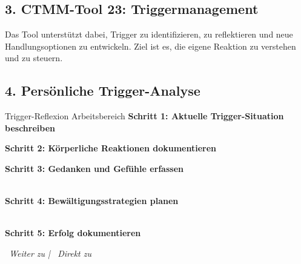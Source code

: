 \subsection*{\textcolor{ctmmOrange}{3. CTMM-Tool 23: Triggermanagement}}

Das Tool unterstützt dabei, Trigger zu identifizieren, zu reflektieren und neue Handlungsoptionen zu entwickeln. Ziel ist es, die eigene Reaktion zu verstehen und zu steuern.

\subsection*{\textcolor{ctmmOrange}{4. Persönliche Trigger-Analyse}}
\label{sec:triggermanagement-analyse}

\begin{ctmmBlueBox}{Trigger-Reflexion Arbeitsbereich}
\textbf{Schritt 1: Aktuelle Trigger-Situation beschreiben}\\

\vspace{0.5cm}
\textbf{Schritt 2: Körperliche Reaktionen dokumentieren}\\

\vspace{0.5cm}
\textbf{Schritt 3: Gedanken und Gefühle erfassen}\\
\\[0.3cm]

\vspace{0.5cm}
\textbf{Schritt 4: Bewältigungsstrategien planen}\\
\\[0.3cm]

\vspace{0.5cm}
\textbf{Schritt 5: Erfolg dokumentieren}\\
\end{ctmmBlueBox}

\vspace{1cm}
\begin{center}
\textit{\textcolor{ctmmGreen}{\faChevronRight~Weiter zu}  | \textcolor{ctmmRed}{\faBookmark~Direkt zu} }
\end{center}
